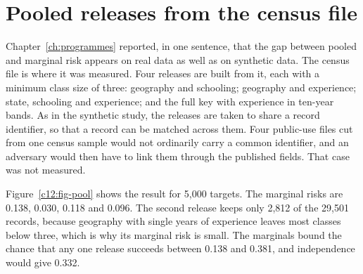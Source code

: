 \section{Pooled releases from the census file}

Chapter~\ref{ch:programmes} reported, in one sentence, that the gap between pooled and
marginal risk appears on real data as well as on synthetic data. The census file is
where it was measured. Four releases are built from it, each with a minimum class size
of three: geography and schooling; geography and experience; state, schooling and
experience; and the full key with experience in ten-year bands. As in the synthetic
study, the releases are taken to share a record identifier, so that a record can be
matched across them.
Four public-use files cut from one census sample would not ordinarily carry a common
identifier, and an adversary would then have to link them through the published
fields. That case was not measured.

Figure~\ref{c12:fig-pool} shows the result for 5,000 targets. The marginal risks are
0.138, 0.030, 0.118 and 0.096. The second release keeps only 2,812 of the 29,501
records, because geography with single years of experience leaves most classes below
three, which is why its marginal risk is small. The marginals bound the chance that
any one release succeeds between 0.138 and 0.381, and independence would give 0.332.

